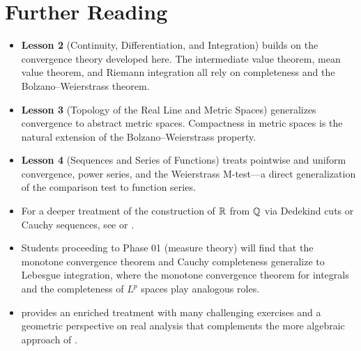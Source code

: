 \documentclass[11pt,a4paper]{article}
\begin{document}
\section{Further Reading}
\label{sec:further_reading}

\begin{itemize}
  \item \textbf{Lesson 2} (Continuity, Differentiation, and Integration)
    builds on the convergence theory developed here. The intermediate
    value theorem, mean value theorem, and Riemann integration all
    rely on completeness and the Bolzano--Weierstrass theorem.

  \item \textbf{Lesson 3} (Topology of the Real Line and Metric Spaces)
    generalizes convergence to abstract metric spaces. Compactness in
    metric spaces is the natural extension of the Bolzano--Weierstrass
    property.

  \item \textbf{Lesson 4} (Sequences and Series of Functions) treats
    pointwise and uniform convergence, power series, and the Weierstrass
    M-test---a direct generalization of the comparison test to function
    series.

  \item For a deeper treatment of the construction of $\mathbb{R}$ from $\mathbb{Q}$
    via Dedekind cuts or Cauchy sequences, see \citet[Chapter 1]{rudin1976}
    or \citet[Chapters 1--5]{tao2016}.

  \item Students proceeding to Phase 01 (measure theory) will find that
    the monotone convergence theorem and Cauchy completeness generalize
    to Lebesgue integration, where the monotone convergence theorem for
    integrals and the completeness of $L^p$ spaces play analogous roles.

  \item \citet{pugh2015} provides an enriched treatment with many
    challenging exercises and a geometric perspective on real analysis
    that complements the more algebraic approach of \citet{rudin1976}.
\end{itemize}


\end{document}
